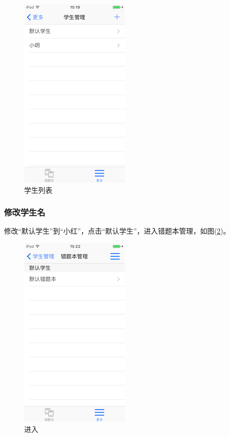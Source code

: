 \begin{figure}[H]
	\centering
	\includegraphics{img/10.png}
	\caption{学生列表}
	\label{img10}
\end{figure}

\subsubsection{修改学生名}
修改“默认学生”到“小红”，点击“默认学生”，进入错题本管理，如图(\ref{img11})。
\begin{figure}[H]
	\centering
	\includegraphics{img/11.png}
	\caption{进入}
	\label{img11}
\end{figure}

